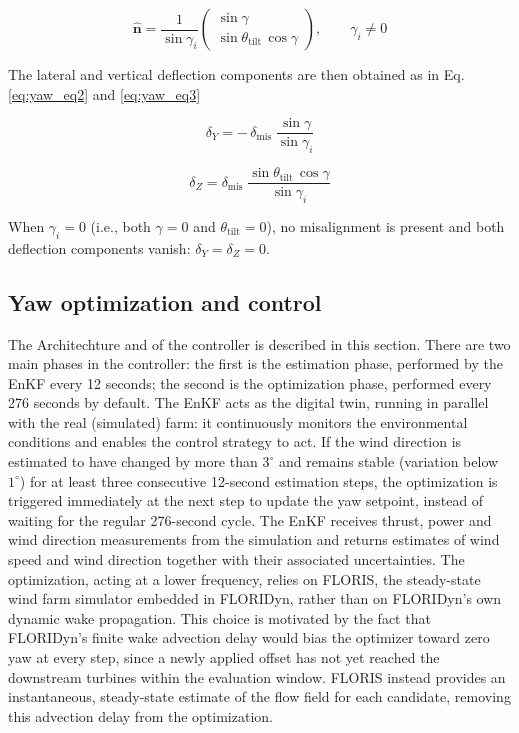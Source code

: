 \documentclass[final,5p,times,twocolumn]{elsarticle}
\begin{document}
\begin{equation}
    \hat{\mathbf{n}} = \frac{1}{\sin\gamma_i}
    \begin{pmatrix}
        \sin\gamma \\
        \sin\theta_{\text{tilt}}\,\cos\gamma
    \end{pmatrix}, \qquad \gamma_i \neq 0
    \label{eq:yaw_eq1}
\end{equation}

The lateral and vertical deflection components are then obtained as in Eq. \eqref{eq:yaw_eq2} and \eqref{eq:yaw_eq3}

\begin{equation}
    \delta_Y = -\,\delta_{\text{mis}}\;\frac{\sin\gamma}{\sin\gamma_i}
    \label{eq:yaw_eq2}
\end{equation}

\begin{equation}
    \delta_Z = \delta_{\text{mis}}\;\frac{\sin\theta_{\text{tilt}}\,
    \cos\gamma}{\sin\gamma_i}
    \label{eq:yaw_eq3}
\end{equation}

\noindent When $\gamma_i = 0$ (i.e., both $\gamma = 0$ and 
$\theta_{\text{tilt}} = 0$), no misalignment is present and both 
deflection components vanish: $\delta_Y = \delta_Z = 0$.




\subsection{Yaw optimization and control}
\label{sec:yaw_optimization}

The Architechture and of the controller is described in this section.
There are two main phases in the controller: the first is the estimation phase, performed by the EnKF every 12 seconds; the second is the optimization phase, performed every 276 seconds by default. The EnKF acts as the digital twin, running in parallel with the real (simulated) farm: it continuously monitors the environmental conditions and enables the control strategy to act. If the wind direction is estimated to have changed by more than $3^\circ$ and remains stable (variation below $1^\circ$) for at least three consecutive 12-second estimation steps, the optimization is triggered immediately at the next step to update the yaw setpoint, instead of waiting for the regular 276-second cycle. The EnKF receives thrust, power and wind direction measurements from the simulation and returns estimates of wind speed and wind direction together with their associated uncertainties.
The optimization, acting at a lower frequency, relies on FLORIS, the steady-state wind farm simulator embedded in FLORIDyn, rather than on FLORIDyn's own dynamic wake propagation. This choice is motivated by the fact that FLORIDyn's finite wake advection delay would bias the optimizer toward zero yaw at every step, since a newly applied offset has not yet reached the downstream turbines within the evaluation window. FLORIS instead provides an instantaneous, steady-state estimate of the flow field for each candidate, removing this advection delay from the optimization.
\end{document}
